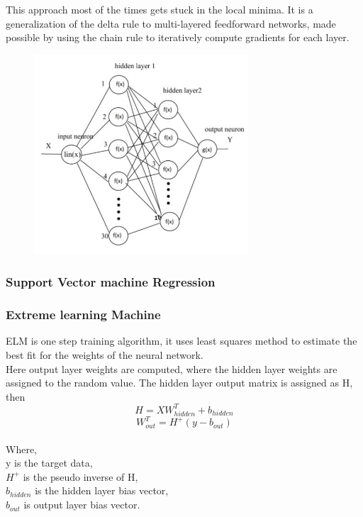 \documentclass[conference]{IEEEtran}
\begin{document}
This approach most of the times gets stuck in the local minima.  It is a generalization of the delta rule to multi-layered feedforward networks, made possible by using the chain rule to iteratively compute gradients for each layer.


\begin{figure}[h]
\includegraphics[width=8cm]{net.png}
\centering
\end{figure}
\subsubsection{Support Vector machine Regression}

\subsubsection{Extreme learning Machine}
ELM is one step training algorithm, it uses least squares method to estimate the best fit for the weights of the neural network. \\
Here output layer weights are computed, where the hidden layer weights are assigned to the random value. The hidden layer output matrix is assigned as H, then 
\begin{equation} \label{eq:3}
H=XW_{hidden}^T+b_{hidden}
\end{equation}
\begin{equation} \label{eq:4}
W_{out}^T=H^+(y-b_{out})
\end{equation}
\\Where,\\
y is the target data,\\
$H^+$ is the pseudo inverse of H,\\
$b_{hidden}$ is the hidden layer bias vector,\\
$b_{out}$ is output layer bias vector.\\
\end{document}
